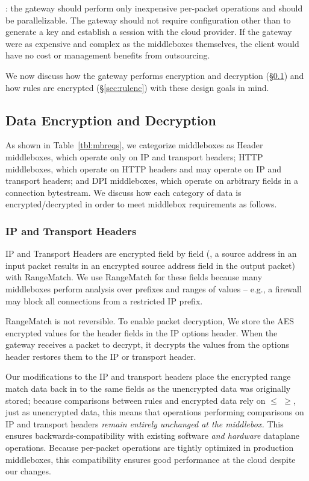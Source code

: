 : the gateway should perform only inexpensive per-packet operations and should be parallelizable. The gateway should not require configuration other than to generate a key and establish a session with the cloud provider. If the gateway were as expensive and complex as the middleboxes themselves, the client would have no cost or management benefits from outsourcing. 

We now discuss how the gateway performs encryption and decryption (\S\ref{sec:dataenc}) and how rules are encrypted (\S\ref{sec:rulenc}) with these design goals in mind.

\subsection{Data Encryption and Decryption}
\label{sec:dataenc}

As shown in Table~\ref{tbl:mbreqs}, we categorize middleboxes as Header middleboxes, which operate only on IP and transport headers; HTTP middleboxes, which operate on HTTP headers and may operate on IP and transport headers; and DPI middleboxes, which operate on arbitrary fields in a connection bytestream. 
We discuss how each category of data is encrypted/decrypted in order to meet middlebox requirements as follows.

\subsubsection{IP and Transport Headers}
IP and Transport Headers are encrypted field by field (\eg{}, a source address in an input packet results in an encrypted source address field in the output packet) with RangeMatch.
We use RangeMatch for these fields because many middleboxes perform analysis over prefixes and ranges of values -- e.g., a firewall may block all connections from a restricted IP prefix.

 RangeMatch is not reversible. To enable packet decryption, We store the AES encrypted values for the header fields in the IP options header. When the gateway receives a packet to decrypt, it decrypts the values from the options header restores them to the IP or transport header.

Our modifications to the IP and transport headers place the encrypted range match data back in to the same fields as the unencrypted data was originally stored; because comparisons between rules and encrypted data rely on $\leq$ $\geq$, just as unencrypted data, this means that operations performing comparisons on IP and transport headers {\it remain entirely unchanged at the middlebox.}
This ensures backwards-compatibility with existing software {\it and hardware} dataplane operations.
Because per-packet operations are tightly optimized in production middleboxes, this compatibility ensures good performance at the cloud despite our changes.

